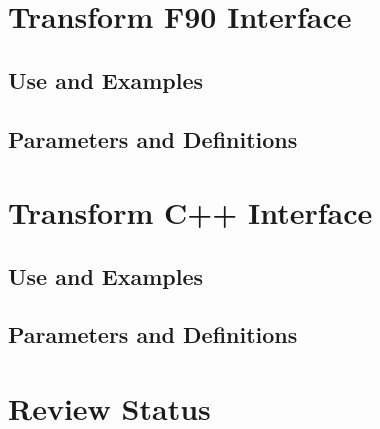 \documentclass[]{article}
\begin{document}



\section{Transform F90 Interface}

\subsection{Use and Examples}




\subsection{Parameters and Definitions}








\section{Transform C++ Interface}

\subsection{Use and Examples}




\subsection{Parameters and Definitions}











\section{Review Status}








 

\end{document}
